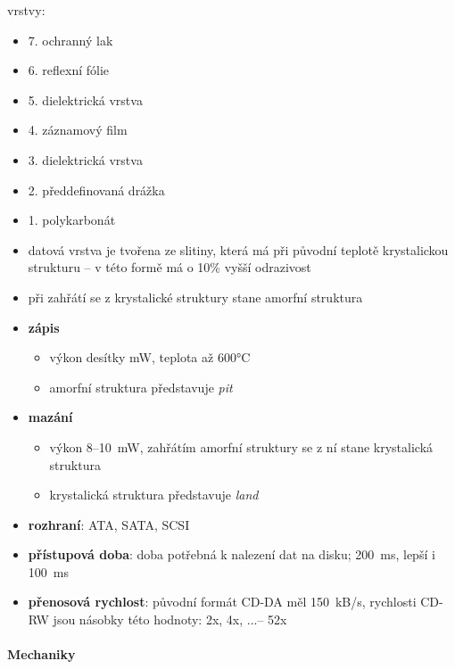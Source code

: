 \documentclass[a4paper,12pt]{article}
\providecommand{\tightlist}{%
\setlength{\itemsep}{0pt}\setlength{\parskip}{0pt}}
\begin{document}
vrstvy:
\begin{itemize}
  \tightlist
  \item[] 7. ochranný lak
  \item[] 6. reflexní fólie
  \item[] 5. dielektrická vrstva
  \item[] 4. záznamový film
  \item[] 3. dielektrická vrstva
  \item[] 2. předdefinovaná drážka
  \item[] 1. polykarbonát
  \newline
  \item datová vrstva je tvořena ze slitiny, která má při původní teplotě
  krystalickou strukturu -- v této formě má o 10\% vyšší odrazivost
  \item při zahřátí se z krystalické struktury stane amorfní struktura
  \item \textbf{zápis}
  \begin{itemize}
    \tightlist
    \item výkon desítky mW, teplota až 600°C
    \item amorfní struktura představuje \emph{pit}
  \end{itemize}
  \item \textbf{mazání}
  \begin{itemize}
    \tightlist
    \item výkon 8--10~mW, zahřátím amorfní struktury se z ní stane krystalická
    struktura
    \item krystalická struktura představuje \emph{land}
  \end{itemize}
  \item \textbf{rozhraní}: ATA, SATA, SCSI
  \item \textbf{přístupová doba}: doba potřebná k nalezení dat na disku; 200~ms,
  lepší i 100~ms
  \item \textbf{přenosová rychlost}: původní formát CD-DA měl 150~kB/s,
  rychlosti CD-RW jsou násobky této hodnoty: 2x, 4x, ...-- 52x
\end{itemize}

\paragraph{Mechaniky}
\end{document}
